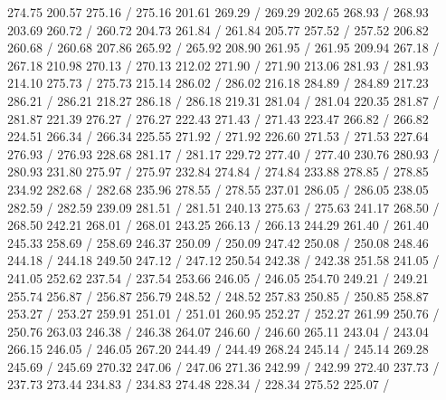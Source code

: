 { 274.75 200.57 275.16 /
 275.16 201.61 269.29 /
 269.29 202.65 268.93 /
 268.93 203.69 260.72 /
 260.72 204.73 261.84 /
 261.84 205.77 257.52 /
 257.52 206.82 260.68 /
 260.68 207.86 265.92 /
 265.92 208.90 261.95 /
 261.95 209.94 267.18 /
 267.18 210.98 270.13 /
 270.13 212.02 271.90 /
 271.90 213.06 281.93 /
 281.93 214.10 275.73 /
 275.73 215.14 286.02 /
 286.02 216.18 284.89 /
 284.89 217.23 286.21 /
 286.21 218.27 286.18 /
 286.18 219.31 281.04 /
 281.04 220.35 281.87 /
 281.87 221.39 276.27 /
 276.27 222.43 271.43 /
 271.43 223.47 266.82 /
 266.82 224.51 266.34 /
 266.34 225.55 271.92 /
 271.92 226.60 271.53 /
 271.53 227.64 276.93 /
 276.93 228.68 281.17 /
 281.17 229.72 277.40 /
 277.40 230.76 280.93 /
 280.93 231.80 275.97 /
 275.97 232.84 274.84 /
 274.84 233.88 278.85 /
 278.85 234.92 282.68 /
 282.68 235.96 278.55 /
 278.55 237.01 286.05 /
 286.05 238.05 282.59 /
 282.59 239.09 281.51 /
 281.51 240.13 275.63 /
 275.63 241.17 268.50 /
 268.50 242.21 268.01 /
 268.01 243.25 266.13 /
 266.13 244.29 261.40 /
 261.40 245.33 258.69 /
 258.69 246.37 250.09 /
 250.09 247.42 250.08 /
 250.08 248.46 244.18 /
 244.18 249.50 247.12 /
 247.12 250.54 242.38 /
 242.38 251.58 241.05 /
 241.05 252.62 237.54 /
 237.54 253.66 246.05 /
 246.05 254.70 249.21 /
 249.21 255.74 256.87 /
 256.87 256.79 248.52 /
 248.52 257.83 250.85 /
 250.85 258.87 253.27 /
 253.27 259.91 251.01 /
 251.01 260.95 252.27 /
 252.27 261.99 250.76 /
 250.76 263.03 246.38 /
 246.38 264.07 246.60 /
 246.60 265.11 243.04 /
 243.04 266.15 246.05 /
 246.05 267.20 244.49 /
 244.49 268.24 245.14 /
 245.14 269.28 245.69 /
 245.69 270.32 247.06 /
 247.06 271.36 242.99 /
 242.99 272.40 237.73 /
 237.73 273.44 234.83 /
 234.83 274.48 228.34 /
 228.34 275.52 225.07 /
}
